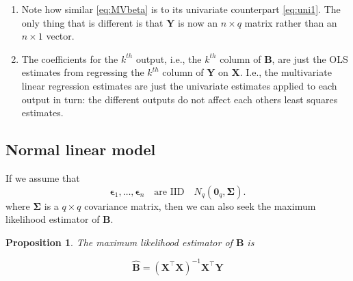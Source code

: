 \documentclass[
]{book}
\newtheorem{proposition}{Proposition}[chapter]
\theoremstyle{definition}
\theoremstyle{definition}
\theoremstyle{definition}
\theoremstyle{definition}
\theoremstyle{remark}
\begin{document}
\begin{enumerate}
\def\labelenumi{\arabic{enumi}.}
\item
  Note how similar \eqref{eq:MVbeta} is to its univariate counterpart
  \eqref{eq:uni1}. The only thing that is different is that \(\mathbf Y\) is now an \(n \times q\) matrix rather than an \(n \times 1\) vector.
\item
  The coefficients for the \(k^{th}\) output, i.e., the \(k^{th}\) column of \(\mathbf B\), are just the OLS estimates from regressing the \(k^{th}\) column of \(\mathbf Y\) on \(\mathbf X\). I.e., the multivariate linear regression estimates are just the univariate estimates applied to each output in turn: the different outputs do not affect each others least squares estimates.
\end{enumerate}

\hypertarget{normal-linear-model-1}{%
\subsection{Normal linear model}\label{normal-linear-model-1}}

If we assume that
\begin{equation}
{\pmb \epsilon_1}, \ldots , {\pmb \epsilon}_n \quad \text{are
IID}\quad N_q({\mathbf 0}_q, \boldsymbol{\Sigma}).
\label{eq:MVNassumption}
\end{equation}
where \(\boldsymbol{\Sigma}\) is a \(q \times q\) covariance matrix,
then we can also seek the maximum likelihood estimator of \(\mathbf B\).

\begin{proposition}
\protect\hypertarget{prp:eight2}{}{\label{prp:eight2} }The maximum likelihood estimator of \(\mathbf B\) is

\begin{equation}
\hat{\mathbf B}= (\mathbf X^\top \mathbf X)^{-1}\mathbf X^\top \mathbf Y
\end{equation}
\end{proposition}
\end{document}
